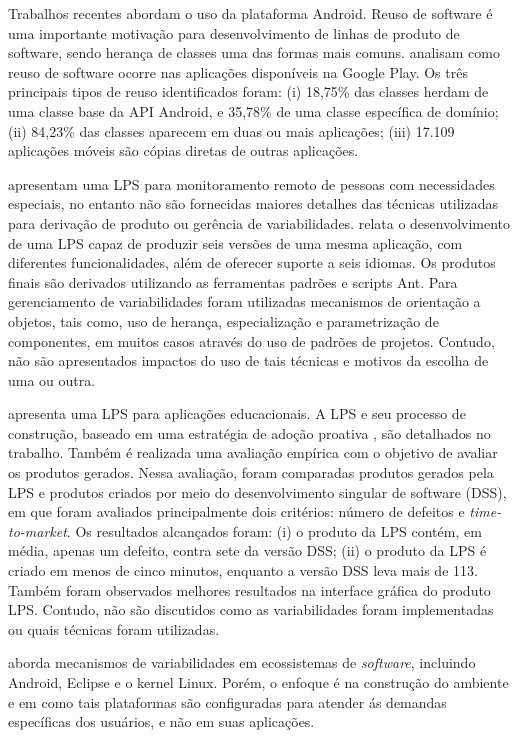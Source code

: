 Trabalhos recentes abordam o uso da plataforma Android. Reuso de software é uma
importante motivação para desenvolvimento de linhas de produto de software, sendo
herança de classes uma das formas mais comuns.  analisam como
reuso de software ocorre nas aplicações disponíveis na Google Play. Os três principais
tipos de reuso identificados foram: (i) 18,75\% das classes herdam de uma classe
base da API Android, e 35,78\% de uma classe específica de domínio; (ii) 84,23\%
das classes aparecem em duas ou mais aplicações; (iii) 17.109 aplicações móveis
são cópias diretas de outras aplicações.

 apresentam uma LPS para monitoramento remoto de pessoas
com necessidades especiais, no entanto não são fornecidas maiores detalhes das
técnicas utilizadas para derivação de produto ou gerência de variabilidades.
 relata o desenvolvimento de uma LPS capaz de produzir seis
versões de uma mesma aplicação, com diferentes funcionalidades, além de oferecer
suporte a seis idiomas. Os produtos finais são derivados utilizando as ferramentas
padrões e scripts Ant. Para gerenciamento de variabilidades foram utilizadas
mecanismos de orientação a objetos, tais como, uso de herança, especialização e
parametrização de componentes, em muitos casos através do uso de padrões de projetos.
Contudo, não são apresentados impactos do uso de tais técnicas e motivos da escolha
de uma ou outra.

 apresenta uma LPS para aplicações educacionais.
A LPS e seu processo de construção, baseado em uma estratégia de adoção proativa
\cite{Krueger2002}, são detalhados no trabalho. Também é realizada uma avaliação
empírica com o objetivo de avaliar os produtos gerados. Nessa avaliação, foram
comparadas produtos gerados pela LPS e produtos criados por meio do desenvolvimento
singular de software (DSS), em que foram avaliados principalmente dois critérios:
número de defeitos e \textit{time-to-market}. Os resultados alcançados foram: (i)
o produto da LPS contém, em média, apenas um defeito, contra sete da versão DSS;
(ii) o produto da LPS é criado em menos de cinco minutos, enquanto a versão DSS
leva mais de 113. Também foram observados melhores resultados na interface gráfica
do produto LPS. Contudo, não são discutidos como as variabilidades foram
implementadas ou quais técnicas foram utilizadas.

 aborda mecanismos de variabilidades em ecossistemas de
\textit{software},
incluindo
Android, Eclipse e o kernel Linux. Porém, o enfoque é na construção do ambiente e
em como tais plataformas são configuradas para atender ás demandas específicas
dos usuários, e não em suas aplicações.

